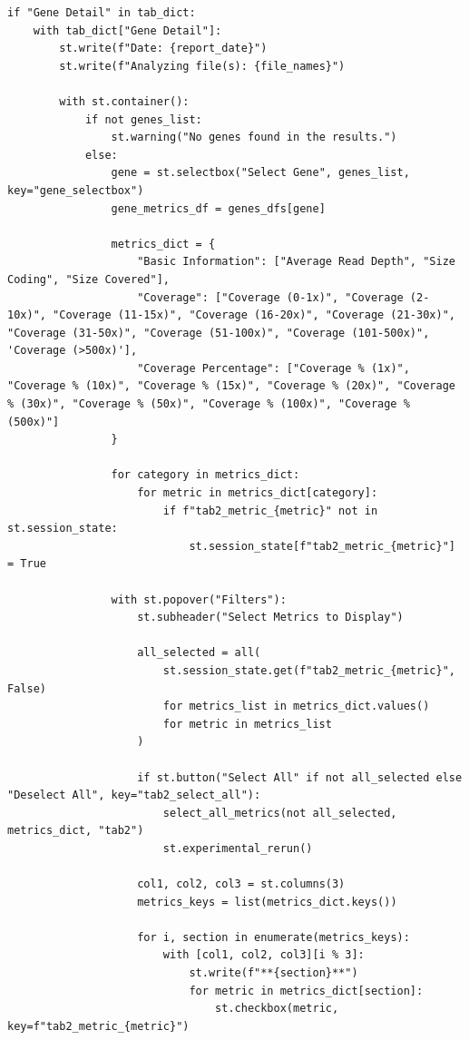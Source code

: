 \begin{longlisting}
\begin{verbatim}
if "Gene Detail" in tab_dict:
    with tab_dict["Gene Detail"]:
        st.write(f"Date: {report_date}")
        st.write(f"Analyzing file(s): {file_names}")
        
        with st.container():
            if not genes_list:
                st.warning("No genes found in the results.")
            else:
                gene = st.selectbox("Select Gene", genes_list, key="gene_selectbox")
                gene_metrics_df = genes_dfs[gene]

                metrics_dict = {
                    "Basic Information": ["Average Read Depth", "Size Coding", "Size Covered"],
                    "Coverage": ["Coverage (0-1x)", "Coverage (2-10x)", "Coverage (11-15x)", "Coverage (16-20x)", "Coverage (21-30x)", "Coverage (31-50x)", "Coverage (51-100x)", "Coverage (101-500x)", 'Coverage (>500x)'],
                    "Coverage Percentage": ["Coverage % (1x)", "Coverage % (10x)", "Coverage % (15x)", "Coverage % (20x)", "Coverage % (30x)", "Coverage % (50x)", "Coverage % (100x)", "Coverage % (500x)"]
                }

                for category in metrics_dict:
                    for metric in metrics_dict[category]:
                        if f"tab2_metric_{metric}" not in st.session_state:
                            st.session_state[f"tab2_metric_{metric}"] = True

                with st.popover("Filters"):
                    st.subheader("Select Metrics to Display")

                    all_selected = all(
                        st.session_state.get(f"tab2_metric_{metric}", False)
                        for metrics_list in metrics_dict.values()
                        for metric in metrics_list
                    )

                    if st.button("Select All" if not all_selected else "Deselect All", key="tab2_select_all"):
                        select_all_metrics(not all_selected, metrics_dict, "tab2")
                        st.experimental_rerun()

                    col1, col2, col3 = st.columns(3)
                    metrics_keys = list(metrics_dict.keys())

                    for i, section in enumerate(metrics_keys):
                        with [col1, col2, col3][i % 3]:
                            st.write(f"**{section}**")
                            for metric in metrics_dict[section]:
                                st.checkbox(metric, key=f"tab2_metric_{metric}")


\end{verbatim}
\end{longlisting}
